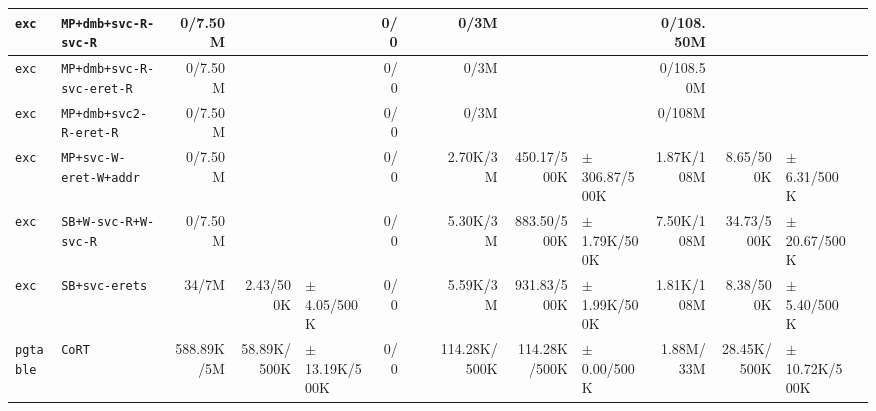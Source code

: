 \begin{tabular}{l l  | r r l | r r l | r r l | r r l l}
         \verb|exc| &                                  \verb|MP+dmb+svc-R-svc-R| &        0/7.50M &                       &                   &            0/0 &                       &                 &           0/3M &                       &                   &      0/108.50M &                       &                   & \\ \hline 
         \verb|exc| &                             \verb|MP+dmb+svc-R-svc-eret-R| &        0/7.50M &                       &                   &            0/0 &                       &                 &           0/3M &                       &                   &      0/108.50M &                       &                   & \\ \hline 
         \verb|exc| &                                \verb|MP+dmb+svc2-R-eret-R| &        0/7.50M &                       &                   &            0/0 &                       &                 &           0/3M &                       &                   &         0/108M &                       &                   & \\ \hline 
         \verb|exc| &                                \verb|MP+svc-W-eret-W+addr| &        0/7.50M &                       &                   &            0/0 &                       &                 &       2.70K/3M &           450.17/500K & $\pm$ 306.87/500K &     1.87K/108M &             8.65/500K &   $\pm$ 6.31/500K & \\ \hline 
         \verb|exc| &                                  \verb|SB+W-svc-R+W-svc-R| &        0/7.50M &                       &                   &            0/0 &                       &                 &       5.30K/3M &           883.50/500K &  $\pm$ 1.79K/500K &     7.50K/108M &            34.73/500K &  $\pm$ 20.67/500K & \\ \hline 
         \verb|exc| &                                        \verb|SB+svc-erets| &          34/7M &             2.43/500K &   $\pm$ 4.05/500K &            0/0 &                       &                 &       5.59K/3M &           931.83/500K &  $\pm$ 1.99K/500K &     1.81K/108M &             8.38/500K &   $\pm$ 5.40/500K & \\ \hline 
     \verb|pgtable| &                                                \verb|CoRT| &     588.89K/5M &           58.89K/500K & $\pm$ 13.19K/500K &            0/0 &                       &                 &   114.28K/500K &          114.28K/500K &   $\pm$ 0.00/500K &      1.88M/33M &           28.45K/500K & $\pm$ 10.72K/500K & \\ \hline 

\end{tabular}

